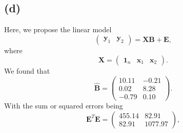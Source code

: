 \message{ !name(examination.tex)}\documentclass[one column]{report}
\renewcommand{\b}[1]{\bm{#1}}
\begin{document}
\subsection*{(d)}

Here, we propose the linear model
\begin{equation*}
  \begin{pmatrix}
    \b y_1 & \b y_2
  \end{pmatrix} = 
  \b X\b B + \b E,
\end{equation*}
where 
\begin{equation*}
 \b X =
  \begin{pmatrix}
    \b 1_n & \b x_1 & \b x_2
  \end{pmatrix}.
\end{equation*}
We found that
\begin{equation*}
 \hat{\b B} =
  \begin{pmatrix}
    10.11 & -0.21 \\ 
    0.02 & 8.28 \\ 
    -0.79 & 0.10 
  \end{pmatrix}.
\end{equation*}
With the sum or squared errors being
\begin{equation*}
  \b E ^{T} \b E = 
  \begin{pmatrix}
    455.14 &82.91 \\ 
    82.91 &1077.97
  \end{pmatrix},
\end{equation*}
\end{document}
